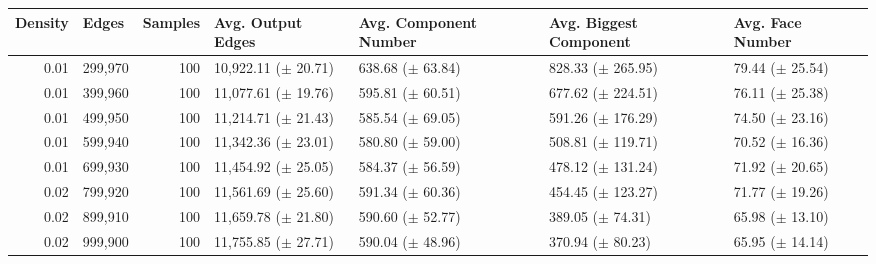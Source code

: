 \begin{tabular}{rlrllll}
\toprule
 Density &   Edges &  Samples &       Avg. Output Edges & Avg. Component Number & Avg. Biggest Component &    Avg. Face Number \\
\midrule
    0.01 & 299,970 &      100 & 10,922.11 ($\pm$ 20.71) &  638.68 ($\pm$ 63.84) &  828.33 ($\pm$ 265.95) & 79.44 ($\pm$ 25.54) \\
    0.01 & 399,960 &      100 & 11,077.61 ($\pm$ 19.76) &  595.81 ($\pm$ 60.51) &  677.62 ($\pm$ 224.51) & 76.11 ($\pm$ 25.38) \\
    0.01 & 499,950 &      100 & 11,214.71 ($\pm$ 21.43) &  585.54 ($\pm$ 69.05) &  591.26 ($\pm$ 176.29) & 74.50 ($\pm$ 23.16) \\
    0.01 & 599,940 &      100 & 11,342.36 ($\pm$ 23.01) &  580.80 ($\pm$ 59.00) &  508.81 ($\pm$ 119.71) & 70.52 ($\pm$ 16.36) \\
    0.01 & 699,930 &      100 & 11,454.92 ($\pm$ 25.05) &  584.37 ($\pm$ 56.59) &  478.12 ($\pm$ 131.24) & 71.92 ($\pm$ 20.65) \\
    0.02 & 799,920 &      100 & 11,561.69 ($\pm$ 25.60) &  591.34 ($\pm$ 60.36) &  454.45 ($\pm$ 123.27) & 71.77 ($\pm$ 19.26) \\
    0.02 & 899,910 &      100 & 11,659.78 ($\pm$ 21.80) &  590.60 ($\pm$ 52.77) &   389.05 ($\pm$ 74.31) & 65.98 ($\pm$ 13.10) \\
    0.02 & 999,900 &      100 & 11,755.85 ($\pm$ 27.71) &  590.04 ($\pm$ 48.96) &   370.94 ($\pm$ 80.23) & 65.95 ($\pm$ 14.14) \\
\bottomrule
\end{tabular}
